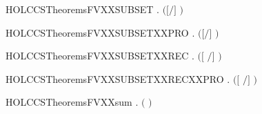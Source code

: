 \newcommand{\HOLCCSTheoremsFVXXrestr}{\UseVerbatim{HOLCCSTheoremsFVXXrestr}}
\begin{SaveVerbatim}{HOLCCSTheoremsFVXXSUBSET}
\HOLTokenTurnstile{} \HOLSymConst{\HOLTokenForall{}}  .  \ensuremath{(}\ensuremath{[}\ensuremath{/}\ensuremath{]} \ensuremath{)} \HOLConst{\HOLTokenSubset{}}   \HOLConst{\HOLTokenUnion{}}  
\end{SaveVerbatim}
\newcommand{\HOLCCSTheoremsFVXXSUBSET}{\UseVerbatim{HOLCCSTheoremsFVXXSUBSET}}
\begin{SaveVerbatim}{HOLCCSTheoremsFVXXSUBSETXXPRO}
\HOLTokenTurnstile{} \HOLSymConst{\HOLTokenForall{}}  .  \ensuremath{(}\ensuremath{[}\ensuremath{/}\ensuremath{]} \ensuremath{)} \HOLConst{\HOLTokenSubset{}}     \HOLConst{\HOLTokenUnion{}}  
\end{SaveVerbatim}
\newcommand{\HOLCCSTheoremsFVXXSUBSETXXPRO}{\UseVerbatim{HOLCCSTheoremsFVXXSUBSETXXPRO}}
\begin{SaveVerbatim}{HOLCCSTheoremsFVXXSUBSETXXREC}
\HOLTokenTurnstile{} \HOLSymConst{\HOLTokenForall{}} .  \ensuremath{(}\ensuremath{[}  \ensuremath{/}\ensuremath{]} \ensuremath{)} \HOLConst{\HOLTokenSubset{}}  
\end{SaveVerbatim}
\newcommand{\HOLCCSTheoremsFVXXSUBSETXXREC}{\UseVerbatim{HOLCCSTheoremsFVXXSUBSETXXREC}}
\begin{SaveVerbatim}{HOLCCSTheoremsFVXXSUBSETXXRECXXPRO}
\HOLTokenTurnstile{} \HOLSymConst{\HOLTokenForall{}} .  \ensuremath{(}\ensuremath{[}  \ensuremath{/}\ensuremath{]} \ensuremath{)} \HOLConst{\HOLTokenSubset{}}    
\end{SaveVerbatim}
\newcommand{\HOLCCSTheoremsFVXXSUBSETXXRECXXPRO}{\UseVerbatim{HOLCCSTheoremsFVXXSUBSETXXRECXXPRO}}
\begin{SaveVerbatim}{HOLCCSTheoremsFVXXsum}
\HOLTokenTurnstile{} \HOLSymConst{\HOLTokenForall{}} .  \ensuremath{(} \HOLSymConst{\ensuremath{+}} \ensuremath{)} \HOLSymConst{\ensuremath{=}}   \HOLConst{\HOLTokenUnion{}}  
\end{SaveVerbatim}
